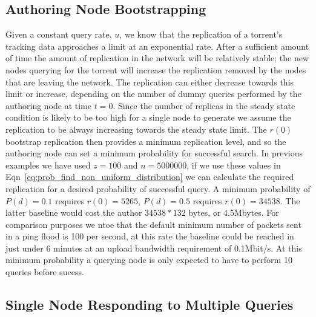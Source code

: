 \subsection{Authoring Node Bootstrapping}

    Given a constant query rate, $u$, we know that the replication of a torrent's tracking data approaches a limit at an exponential rate. After a sufficient amount of time the amount of replication in the network will be relatively stable; the new nodes querying for the torrent will increase the replication removed by the nodes that are leaving the network. The replication can either decrease towards this limit or increase, depending on the number of dummy queries performed by the authoring node at time $t=0$. Since the number of replicas in the steady state condition is likely to be too high for a single node to generate we assume the replication to be always increasing towards the steady state limit. The $r(0)$ bootstrap replication then provides a minimum replication level, and so the authoring node can set a minimum probability for successful search. In previous examples we have used $z=100$ and $n=5000000$, if we use these values in Eqn~\ref{eq:prob_find_non_uniform_distribution} we can calculate the required replication for a desired probability of successful query. A minimum probability of $P(d)=0.1$ requires $r(0)=5265$, $P(d)=0.5$ requires $r(0)=34538$. The latter baseline would cost the author $34538*132$ bytes, or 4.5Mbytes. For comparison purposes we ntoe that the default minimum number of packets sent in a ping flood is 100 per second, at this rate the baseline could be reached in just under 6 minutes at an upload bandwidth requirement of 0.1Mbit/s. At this minimum probability a querying node is only expected to have to perform 10 queries before sucess.

\subsection{Single Node Responding to Multiple Queries}

